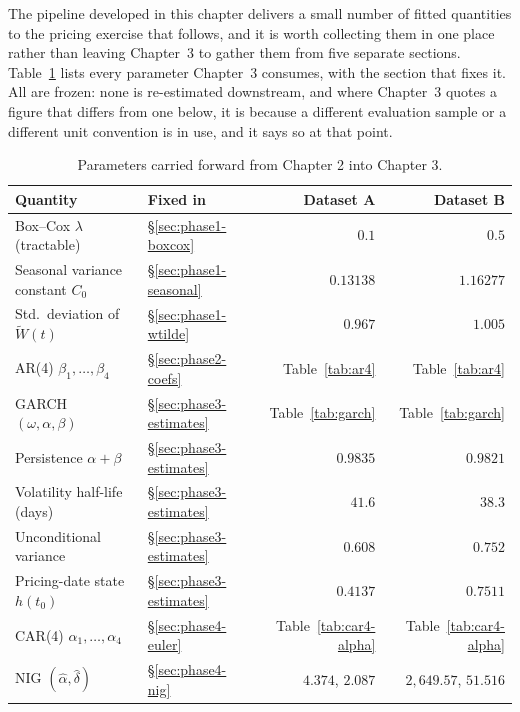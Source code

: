 \documentclass[11pt, a4paper, twoside]{article}
\begin{document}
The pipeline developed in this chapter delivers a small number of fitted quantities to the pricing exercise that follows, and it is worth collecting them in one place rather than leaving Chapter~3 to gather them from five separate sections. Table~\ref{tab:handover} lists every parameter Chapter~3 consumes, with the section that fixes it. All are frozen: none is re-estimated downstream, and where Chapter~3 quotes a figure that differs from one below, it is because a different evaluation sample or a different unit convention is in use, and it says so at that point.

\begin{table}[htbp]
\centering
\small
\caption{Parameters carried forward from Chapter 2 into Chapter 3.}
\label{tab:handover}
\begin{tabular}{l l r r}
\toprule
\textbf{Quantity} & \textbf{Fixed in} & \textbf{Dataset A} & \textbf{Dataset B} \\
\midrule
Box--Cox $\lambda$ (tractable) & \S\ref{sec:phase1-boxcox} & $0.1$ & $0.5$ \\
Seasonal variance constant $C_0$ & \S\ref{sec:phase1-seasonal} & $0.13138$ & $1.16277$ \\
Std.\ deviation of $\widetilde W(t)$ & \S\ref{sec:phase1-wtilde} & $0.967$ & $1.005$ \\
AR(4) $\beta_1,\dots,\beta_4$ & \S\ref{sec:phase2-coefs} & Table~\ref{tab:ar4} & Table~\ref{tab:ar4} \\
GARCH $(\omega,\alpha,\beta)$ & \S\ref{sec:phase3-estimates} & Table~\ref{tab:garch} & Table~\ref{tab:garch} \\
Persistence $\alpha+\beta$ & \S\ref{sec:phase3-estimates} & $0.9835$ & $0.9821$ \\
Volatility half-life (days) & \S\ref{sec:phase3-estimates} & $41.6$ & $38.3$ \\
Unconditional variance & \S\ref{sec:phase3-estimates} & $0.608$ & $0.752$ \\
Pricing-date state $h(t_0)$ & \S\ref{sec:phase3-estimates} & $0.4137$ & $0.7511$ \\
CAR(4) $\alpha_1,\dots,\alpha_4$ & \S\ref{sec:phase4-euler} & Table~\ref{tab:car4-alpha} & Table~\ref{tab:car4-alpha} \\
NIG $(\hat\alpha,\hat\delta)$ & \S\ref{sec:phase4-nig} & $4.374$, $2.087$ & $2{,}649.57$, $51.516$ \\
\bottomrule
\end{tabular}
\end{table}
\end{document}
